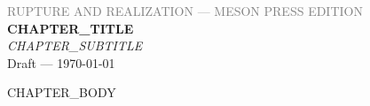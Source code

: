 \documentclass[12pt,a4paper]{article}
\begin{document}
\begin{center}
{\sffamily\small\textcolor{gray}{RUPTURE AND REALIZATION — MESON PRESS EDITION}}\\[0.5em]
{\LARGE\bfseries CHAPTER_TITLE}\\[0.3em]
{\large\itshape CHAPTER_SUBTITLE}\\[1em]
{\sffamily\small Draft — \today}
\end{center}

\bigskip

CHAPTER_BODY
\end{document}
